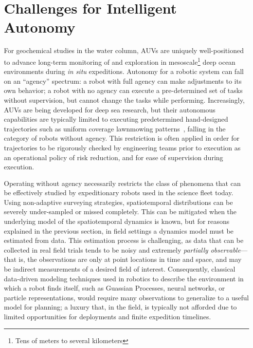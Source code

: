 \section{Challenges for Intelligent Autonomy}
For geochemical studies in the water column, AUVs are uniquely well-positioned to advance long-term monitoring of and exploration in mesoscale\footnote{Tens of meters to several kilometers} deep ocean environments during \emph{in situ} expeditions.
Autonomy for a robotic system can fall on an ``agency'' spectrum: a robot with full agency can make adjustments to its own behavior; a robot with no agency can execute a pre-determined set of tasks without supervision, but cannot change the tasks while performing.
Increasingly, AUVs are being developed for deep sea research\autocite{kaiser2016design,yuh2000design,okamoto2019visual,maki2014auv}, but their autonomous capabilities are typically limited to executing predetermined hand-designed trajectories such as uniform coverage lawnmowing patterns~\autocite{camilli2010tracking}, falling in the category of robots without agency.
This restriction is often applied in order for trajectories to be rigorously checked by engineering teams prior to execution as an operational policy of risk reduction, and for ease of supervision during execution.

Operating without agency necessarily restricts the class of phenomena that can be effectively studied by expeditionary robots used in the science fleet today.
Using non-adaptive surveying strategies, spatiotemporal distributions can be severely under-sampled or missed completely\autocite{flaspohler2019information, preston2019adaptive}.
This can be mitigated when the underlying model of the spatiotemporal dynamics is known, but for reasons explained in the previous section, in field settings a dynamics model must be estimated from data.
This estimation process is challenging, as data that can be collected in real field trials tends to be noisy and extremely \emph{partially observable}---that is, the observations are only at point locations in time and space, and may be indirect measurements of a desired field of interest. 
Consequently, classical data-driven modeling techniques used in robotics to describe the environment in which a robot finds itself, such as Guassian Processes\autocite{Rasmussen2004}, neural networks\autocite{cohn1994neural,wang2017predrnn}, or particle representations\autocite{Silver2010}, would require many observations to generalize to a useful model for planning; a luxury that, in the field, is typically not afforded due to limited opportunities for deployments and finite expedition timelines.


